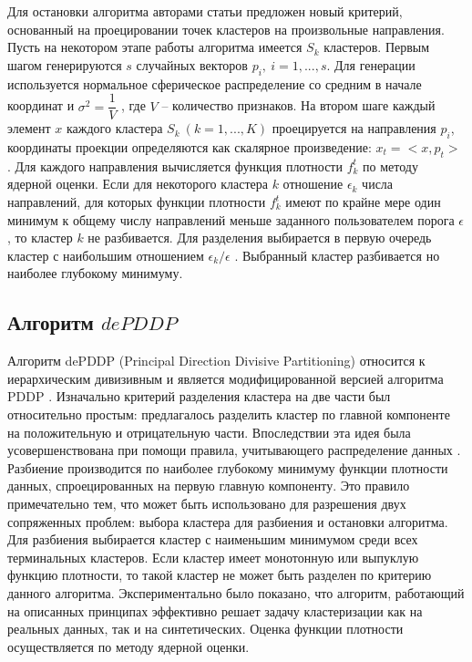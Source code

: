 \documentclass[12pt]{instruction}
\begin{document}
Для остановки алгоритма авторами статьи \cite{kovaleva} предложен новый критерий, основанный на проецировании точек кластеров на произвольные направления. Пусть на некотором этапе работы алгоритма имеется $ S_{k} $ кластеров. Первым шагом генерируются $ s $ случайных векторов $ p_{i},\:i=1,...,s $. Для генерации используется нормальное сферическое распределение со средним в начале координат и $ \sigma^{2}=\dfrac{1}{V} $ , где $ V $ – количество признаков. На втором шаге каждый элемент $ x $ каждого кластера $ S_{k}\:(k=1,...,K) $  проецируется на направления $ p_{i} $, координаты проекции определяются как скалярное произведение: $ x_{t}=<x,p_{t}> $ . Для каждого направления вычисляется функция плотности $ f_{k}^{t} $ по методу ядерной оценки. Если для некоторого кластера $ k $ отношение $ \epsilon_{k} $ числа направлений, для которых функции плотности  $ f_{k}^{t} $ имеют по крайне мере один минимум к общему числу направлений меньше заданного пользователем порога $ \epsilon $ , то кластер $ k $ не разбивается. Для разделения выбирается в первую очередь кластер с наибольшим отношением $ \epsilon_{k}/\epsilon $ . Выбранный кластер разбивается но наиболее глубокому минимуму.  

\subsection{Алгоритм $ dePDDP $}

Алгоритм dePDDP (Principal Direction Divisive Partitioning) относится к иерархическим дивизивным и является модифицированной версией алгоритма PDDP \cite{PDDP} . Изначально критерий разделения кластера на две части был относительно простым: предлагалось разделить кластер по главной компоненте на положительную и отрицательную части. Впоследствии эта идея была усовершенствована при помощи правила, учитывающего распределение данных \cite{tas}. Разбиение производится по наиболее глубокому минимуму функции плотности данных, спроецированных на первую главную компоненту. Это правило примечательно тем, что может быть использовано для разрешения двух сопряженных проблем: выбора кластера для разбиения и остановки алгоритма. Для разбиения выбирается кластер с наименьшим минимумом среди всех терминальных кластеров. Если кластер имеет монотонную или выпуклую функцию плотности, то такой кластер не может быть разделен по критерию данного алгоритма. Экспериментально было показано, что алгоритм, работающий на описанных принципах эффективно решает задачу кластеризации как на реальных данных, так и на синтетических. 
Оценка функции плотности осуществляется по методу ядерной оценки.
\end{document}
